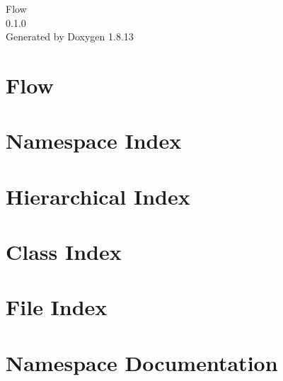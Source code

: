 \documentclass[twoside]{book}
\newcommand{\+}{\discretionary{\mbox{\scriptsize$\hookleftarrow$}}{}{}}
\newcommand{\clearemptydoublepage}{%
  \newpage{\pagestyle{empty}\cleardoublepage}%
}
\begin{document}
\hypersetup{pageanchor=false,
             bookmarksnumbered=true,
             pdfencoding=unicode
            }
\begin{titlepage}
\vspace*{7cm}
\begin{center}%
{\Large Flow \\[1ex]\large 0.\+1.\+0 }\\
\vspace*{1cm}
{\large Generated by Doxygen 1.8.13}\\
\end{center}
\end{titlepage}
\clearemptydoublepage
{}
\tableofcontents
\clearemptydoublepage
{}
\hypersetup{pageanchor=true}

\chapter{Flow}
\label{index}\hypertarget{index}{}
\chapter{Namespace Index}

\chapter{Hierarchical Index}

\chapter{Class Index}

\chapter{File Index}

\chapter{Namespace Documentation}



\end{document}
